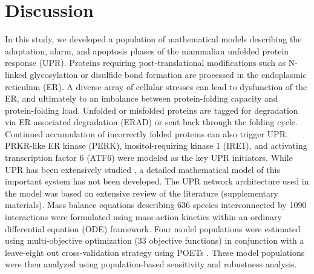 \documentclass[fleqn,10pt]{wlscirep}
\begin{document}
\section*{Discussion}

In this study, we developed a population of mathematical models describing the adaptation, alarm, and apoptosis phases of the mammalian unfolded protein response (UPR).
Proteins requiring post-translational modifications such as N-linked glycosylation or disulfide bond formation are processed in the endoplasmic reticulum (ER).
A diverse array of cellular stresses can lead to dysfunction of the ER, and ultimately to an imbalance between protein-folding capacity and protein-folding load.
Unfolded or misfolded proteins are tagged for degradation via ER associated degradation (ERAD) or sent back through the folding cycle.
Continued accumulation of incorrectly folded proteins can also trigger UPR.
PRKR-like ER kinase (PERK), inositol-requiring kinase 1 (IRE1), and activating transcription factor 6 (ATF6) were modeled as the key UPR initiators.
While UPR has been extensively studied \cite{naidoo2009er, ron2002translational, kaufman2002unfolded,ellgaard2003qce,Fonseca:2009fk,Schroder:2005vn,gotoh:hdc,mccullough2001gsc, belmont2008cga,Hetz:2009qc,Urano:2000uq,szegezdi2006mediators},
a detailed mathematical model of this important system has not been developed.
The UPR network architecture used in the model was based on extensive review of the literature (supplementary materials).
Mass balance equations describing 636 species interconnected by 1090 interactions were formulated using mass-action kinetics within an ordinary differential equation (ODE) framework.
Four model populations were estimated using multi-objective optimization (33 objective functions) in conjunction with a leave-eight out cross-validation strategy using POETs \cite{Song:2010ij}.
These model populations were then analyzed using population-based sensitivity and robustness analysis.
\end{document}
